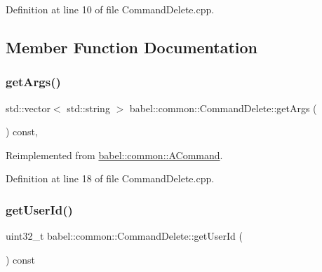 Definition at line 10 of file Command\+Delete.\+cpp.



\subsection{Member Function Documentation}
\mbox{\label{classbabel_1_1common_1_1_command_delete_ac57ab78ea9b285a59834ca035d3cb7de}} 
\subsubsection{\texorpdfstring{get\+Args()}{getArgs()}}
{\footnotesize\ttfamily std\+::vector$<$ std\+::string $>$ babel\+::common\+::\+Command\+Delete\+::get\+Args (\begin{DoxyParamCaption}{ }\end{DoxyParamCaption}) const\hspace{0.3cm}{\ttfamily [override]}, {\ttfamily [virtual]}}



Reimplemented from \mbox{\hyperlink{classbabel_1_1common_1_1_a_command_a67b110bc98f6c47b0739c6eba9a5432e}{babel\+::common\+::\+A\+Command}}.



Definition at line 18 of file Command\+Delete.\+cpp.

\mbox{\label{classbabel_1_1common_1_1_command_delete_a3a3ab2c36103c3eb329d989f0bd18782}} 
\subsubsection{\texorpdfstring{get\+User\+Id()}{getUserId()}}
{\footnotesize\ttfamily uint32\+\_\+t babel\+::common\+::\+Command\+Delete\+::get\+User\+Id (\begin{DoxyParamCaption}{ }\end{DoxyParamCaption}) const}



